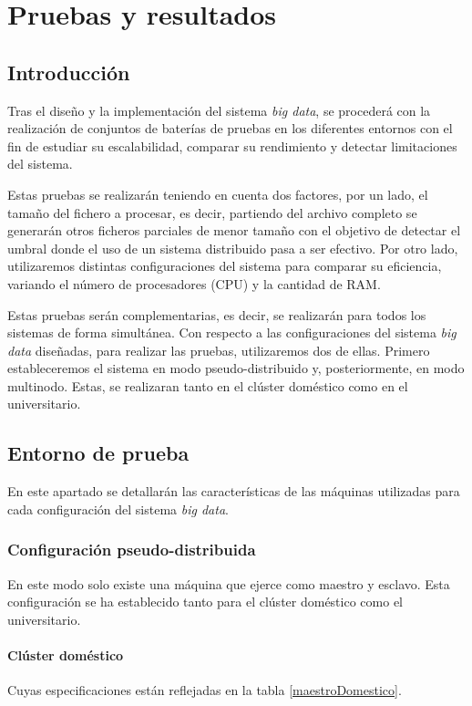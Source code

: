 \chapter{Pruebas y resultados\label{sec:resultados}}

\section{Introducción}
Tras el diseño y la implementación del sistema \textit{big data}, se procederá con la realización de conjuntos de baterías de pruebas en los diferentes entornos con el fin de estudiar su escalabilidad, comparar su rendimiento y detectar limitaciones del sistema. 

Estas pruebas se realizarán teniendo en cuenta dos factores, por un lado, el tamaño del fichero a procesar, es decir, partiendo del archivo completo se generarán otros ficheros parciales de menor tamaño con el objetivo de detectar el umbral donde el uso de un sistema distribuido pasa a ser efectivo. Por otro lado, utilizaremos distintas configuraciones del sistema para comparar su eficiencia, variando el número de procesadores (\gls{CPU}) y la cantidad de \gls{RAM}.

Estas pruebas serán complementarias, es decir, se realizarán para todos los sistemas de forma simultánea. Con respecto a las configuraciones del sistema \textit{big data} diseñadas, para realizar las pruebas, utilizaremos dos de ellas. Primero estableceremos el sistema en modo pseudo-distribuido y, posteriormente, en modo multinodo. Estas, se realizaran tanto en el clúster doméstico como en el universitario.

\section{Entorno de prueba}
En este apartado se detallarán las características de las máquinas utilizadas para cada configuración del sistema \textit{big data}.

\subsection{Configuración pseudo-distribuida}
En este modo solo existe una máquina que ejerce como maestro y esclavo. Esta configuración se ha establecido tanto para el clúster doméstico como el universitario.

\subsubsection{Clúster doméstico \label{pseudodomestico}}
Cuyas especificaciones están reflejadas en la tabla \ref{maestroDomestico}.

